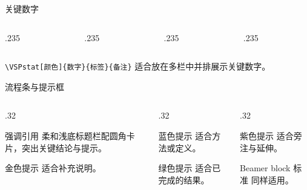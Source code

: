 \documentclass[aspectratio=169,10pt]{beamer}
\begin{document}
\begin{frame}[t]{关键数字}
\begin{columns}[T,onlytextwidth]
  \begin{column}{.235\textwidth}\end{column}
  \begin{column}{.235\textwidth}\end{column}
  \begin{column}{.235\textwidth}\end{column}
  \begin{column}{.235\textwidth}\end{column}
\end{columns}

\vspace{4pt}
\texttt{\textbackslash VSPstat[颜色]\{数字\}\{标签\}\{备注\}} 适合放在多栏中并排展示关键数字。

\end{frame}

\begin{frame}[t]{流程条与提示框}

\vspace{6pt}
\begin{columns}[T,onlytextwidth]
  \begin{column}{.32\textwidth}
    \begin{vspquote}{强调引用}
      柔和浅底标题栏配圆角卡片，突出关键结论与提示。
    \end{vspquote}
    \begin{vspquoteyellow}{金色提示}
      适合补充说明。
    \end{vspquoteyellow}
  \end{column}
  \begin{column}{.32\textwidth}
    \begin{vspquoteblue}{蓝色提示}
      适合方法或定义。
    \end{vspquoteblue}
    \begin{vspquotegreen}{绿色提示}
      适合已完成的结果。
    \end{vspquotegreen}
  \end{column}
  \begin{column}{.32\textwidth}
    \begin{vspquotepurple}{紫色提示}
      适合旁注与延伸。
    \end{vspquotepurple}
    \begin{block}{Beamer block}
      标准  同样适用。
    \end{block}
  \end{column}
\end{columns}
\end{frame}
\end{document}
